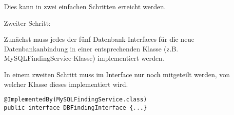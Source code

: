 Dies kann in zwei einfachen Schritten erreicht werden.

\begin{labeling}{Zweiter Schritt:}
	\item [Erster Schritt:] Zunächst muss jedes der fünf Datenbank-Interfaces für die neue Datenbankanbindung in einer entsprechenden Klasse (z.B. MySQL\-Finding\-Service-Klasse) implementiert werden. 
	\item [Zweiter Schritt:] In einem zweiten Schritt muss im Interface nur noch mitgeteilt werden, von welcher Klasse dieses implementiert wird.

\begin{lstlisting}[caption={Andere Datenbank verwenden}, label=changeDatabase]
@ImplementedBy(MySQLFindingService.class)
public interface DBFindingInterface {...}
\end{lstlisting}
\end{labeling}
